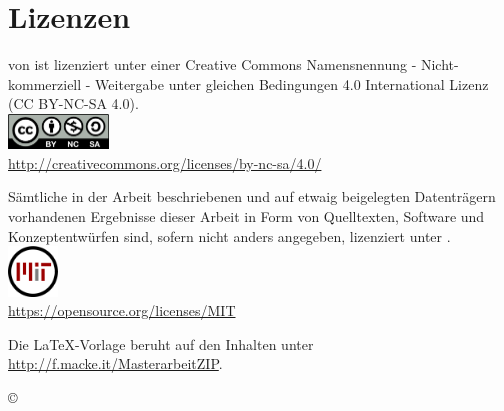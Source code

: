 \chapter*{Lizenzen}

\begin{center}

\vspace*{\fill}

\quotes{\thema} von \autor\space ist lizenziert unter einer Creative Commons Namensnennung - Nicht-kommerziell - Weitergabe unter gleichen Bedingungen 4.0 International Lizenz (CC BY-NC-SA 4.0). \\
\includegraphics[width=0.2\textwidth]{Bilder/by-nc-sa-eu}\\
\url{http://creativecommons.org/licenses/by-nc-sa/4.0/}

\vspace*{\fill}

Sämtliche in der Arbeit beschriebenen und auf etwaig beigelegten Datenträgern
vorhandenen Ergebnisse dieser Arbeit in Form von Quelltexten, Software und
Konzeptentwürfen sind, sofern nicht anders angegeben, lizenziert unter . \\
\includegraphics[width=0.1\textwidth]{Bilder/mit_license}\\
\url{https://opensource.org/licenses/MIT}

\vspace*{\fill}

Die LaTeX-Vorlage beruht auf den Inhalten unter\\
\url{http://f.macke.it/MasterarbeitZIP}.

\vspace*{\fill}

{\large \copyright {} \space \autor}

\vspace*{\fill}

\end{center}
